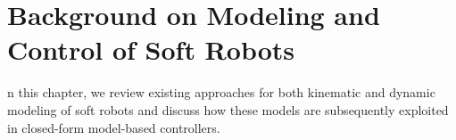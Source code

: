 \chapter{Background on Modeling and Control of Soft Robots}\label{chp:background}

n this chapter, we review existing approaches for both kinematic and dynamic modeling of soft robots and discuss how these models are subsequently exploited in closed-form model-based controllers.



